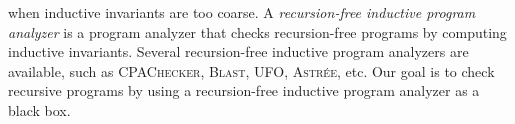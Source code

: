 when inductive invariants are too coarse. 
A \emph{recursion-free
  inductive program analyzer} is a program analyzer that checks
recursion-free programs by computing inductive invariants. Several recursion-free
inductive program analyzers are available, such as \textsc{CPAChecker},
\textsc{Blast}, \textsc{UFO}, \textsc{Astr\'ee}, etc. Our goal is to check
recursive programs by using a recursion-free inductive program analyzer
as a black box.
